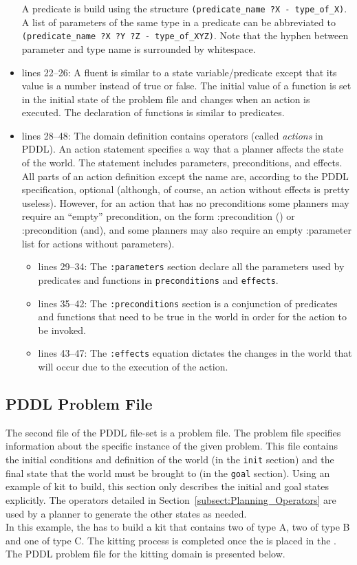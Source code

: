 \begin{itemize}
    A predicate is build using the structure \texttt{(predicate\_name ?X - type\_of\_X)}. A list of parameters of the same type in a predicate can be abbreviated to \texttt{(predicate\_name ?X ?Y ?Z - type\_of\_XYZ)}. Note that the hyphen between parameter and type name is surrounded by whitespace.
\item lines 22--26: A fluent is similar to a state variable/predicate except that its value is a number instead of true or false. The initial value of a function is set in the initial state of the problem file and changes when an action is executed. The declaration of functions is similar to predicates.
\item lines 28--48: The domain definition contains operators (called \textit{actions} in PDDL). An action statement specifies a way that a planner affects the state of the world. The statement includes parameters, preconditions, and effects. All parts of an action definition except the name are, according to the PDDL specification, optional (although, of course, an action without effects is pretty useless). However, for an action that has no preconditions some planners may require an ``empty'' precondition, on the form :precondition () or :precondition (and), and some planners may also require an empty :parameter list for actions without parameters).
\begin{itemize}
\item lines 29--34: The \texttt{:parameters} section declare all the parameters used by predicates and functions in \texttt{preconditions} and \texttt{effects}.
\item lines 35--42:  The \texttt{:preconditions} section is a conjunction of predicates and functions that need to be true in the world in order for the action to be invoked.
\item lines 43--47: The \texttt{:effects} equation dictates the changes in the world that will occur due to the execution of the action.
\end{itemize}
\end{itemize}


\subsection{PDDL Problem File}\label{S:PDDL-problem}
The second file of the PDDL file-set is a  problem file. The problem file specifies information about the specific instance of the given problem. This file contains the initial conditions and definition of the world (in the \texttt{init} section) and the final state that the world must be brought to (in the \texttt{goal} section). Using an example of kit to build, this section only describes the initial and goal states explicitly. The operators detailed in Section~\ref{subsect:Planning_Operators} are used by a planner to generate the other states as needed.\\
In this example, the  has to build a kit that contains two  of type A, two  of type B and one  of type C. The kitting process is completed once the  is placed in the . The PDDL problem file for the kitting domain is presented below.

